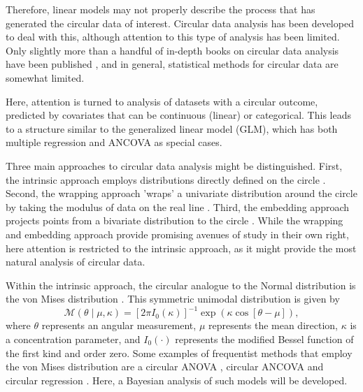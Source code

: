 \documentclass[11pt,a4paper]{article}\usepackage[]{graphicx}\usepackage[]{color}
\begin{document}
Therefore, linear models may not properly describe the process that has generated the circular data of interest. Circular data analysis has been developed to deal with this, although attention to this type of analysis has been limited. Only slightly more than a handful of in-depth books on circular data analysis have been published \citep{fisher1995statistical, mardia1999directional, pewsey2013circular, jammalamadaka2001topics}, and in general, statistical methods for circular data are somewhat limited.

Here, attention is turned to analysis of datasets with a circular outcome, predicted by covariates that can be continuous (linear) or categorical. This leads to a structure similar to the generalized linear model (GLM), which has both multiple regression and ANCOVA as special cases.

Three main approaches to circular data analysis might be distinguished. First, the intrinsic approach employs distributions directly defined on the circle  \citep{fisher1992regression, artes2008hypothesis}. Second, the wrapping approach 'wraps' a univariate distribution around the circle by taking the modulus of data on the real line \citep{ferrari2009wrapping, coles1998inference}. Third, the embedding approach projects points from a bivariate distribution to the circle \citep{nunez2011bayesian, nunez2014bayesian, hernandez2015general, maruotti2016analyzing}. While the wrapping and embedding approach provide promising avenues of study in their own right, here attention is restricted to the intrinsic approach, as it might provide the most natural analysis of circular data.

Within the intrinsic approach, the circular analogue to the Normal distribution is the von Mises distribution \citep{von1918ganzzahligkeit}. This symmetric unimodal distribution is given by
\begin{equation}
\mathcal{M}(\theta \mid \mu, \kappa) = \left[ 2 \pi I_0(\kappa) \right]^{-1}
\exp \left( \kappa \cos \left[ \theta - \mu \right] \right),
\end{equation}
where \( \theta \) represents an angular measurement, \( \mu \) represents the mean direction, \( \kappa \) is a concentration parameter, and \( I_0(\cdot) \) represents the modified Bessel function of the first kind and order zero. Some examples of frequentist methods that employ the von Mises distribution are a circular ANOVA \citep{watson1956construction}, circular ANCOVA \citep{artes2008hypothesis} and circular regression \citep{fisher1992regression}. Here, a Bayesian analysis of such models will be developed.
\end{document}
